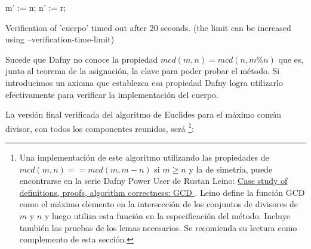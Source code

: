 \documentclass[12pt, a4paper, openany, fleqn]{book}
\begin{document}
    \begin{whitebox}
    \begin{dafny}[gobble=8,firstnumber=8]
            m' := n;
            n' := r;
    \end{dafny}
    \end{whitebox}
    \begin{redbox}[after skip=2ex]
    \begin{dafny}[gobble=8,firstnumber=11]
        }
    \end{dafny}
    \end{redbox}

    \begin{redbox}[after skip=2ex]
        Verification of 'cuerpo' timed out after 20 seconds. (the limit can be increased using --verification-time-limit)
    \end{redbox}


    Sucede que Dafny no conoce la propiedad $mcd(m, n) = mcd(n, m\%n)$ que es, junto al teorema de la asignación, la clave para poder probar el método. Si introducimos un axioma que establezca esa propiedad Dafny logra utilizarlo efectivamente para verificar la implementación del cuerpo.

    \begin{greenbox}
    \end{greenbox}

    La versión final verificada del algoritmo de Euclides para el máximo común divisor, con todos los componentes reunidos, será \footnote{
    Una implementación de este algoritmo utilizando las propiedades de $mcd(m, n) == mcd(m, m - n)$ si $m \ge n$ y la de simetría, puede encontrarse en la serie Dafny Power User de Rustan Leino: \href{https://leino.science/papers/krml279.html}{Case study of definitions, proofs, algorithm correctness: GCD
    }. Leino define la función GCD como el máximo elemento en la intersección de los conjuntos de divisores de $m$ y $n$ y luego utiliza esta función en la especificación del método. Incluye también las pruebas de los lemas necesarios. Se recomienda su lectura como complemento de esta sección.}:
\end{document}
